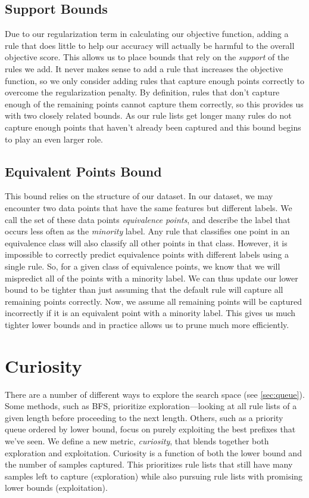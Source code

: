 \subsection{Support Bounds}
Due to our regularization term in calculating our objective function, adding a rule that does little to help our accuracy will actually be harmful to the overall objective score.
This allows us to place bounds that rely on the \textit{support} of the rules we add.
It never makes sense to add a rule that increases the objective function, so we only consider adding rules that capture enough points correctly to overcome the regularization penalty.
By definition, rules that don't capture enough of the remaining points cannot capture them correctly, so this provides us with two closely related bounds.
As our rule lists get longer many rules do not capture enough points that haven't already been captured and this bound begins to play an even larger role.

\subsection{Equivalent Points Bound}
This bound relies on the structure of our dataset.
In our dataset, we may encounter two data points that have the same features but different labels.
We call the set of these data points \textit{equivalence points}, and describe the label that occurs less often as the \textit{minority} label.
Any rule that classifies one point in an equivalence class will also classify all other points in that class.
However, it is impossible to correctly predict equivalence points with different labels using a single rule.
So, for a given class of equivalence points, we know that we will mispredict all of the points with a minority label.
We can thus update our lower bound to be tighter than just assuming that the default rule will capture all remaining points correctly.
Now, we assume all remaining points will be captured incorrectly if it is an equivalent point with a minority label.
This gives us much tighter lower bounds and in practice allows us to prune much more efficiently.

\section{Curiosity}
There are a number of different ways to explore the search space (see \ref{sec:queue}).
Some methods, such as BFS, prioritize exploration---looking at all rule lists of a given length before proceeding to the next length.
Others, such as a priority queue ordered by lower bound, focus on purely exploiting the best prefixes that we've seen.
We define a new metric, \textit{curiosity}, that blends together both exploration and exploitation.
Curiosity is a function of both the lower bound and the number of samples captured.
This prioritizes rule lists that still have many samples left to capture (exploration) while also pursuing rule lists with promising lower bounds (exploitation).

